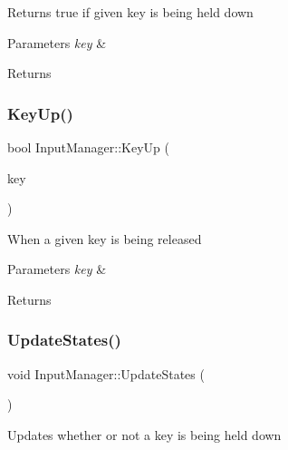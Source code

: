 Returns true if given key is being held down 


\begin{DoxyParams}{Parameters}
{\em key} & \\
\hline
\end{DoxyParams}
\begin{DoxyReturn}{Returns}

\end{DoxyReturn}
\mbox{\label{class_input_manager_a51be2b05d46039439a8f104d374a18aa}} 
\subsubsection{\texorpdfstring{Key\+Up()}{KeyUp()}}
{\footnotesize\ttfamily bool Input\+Manager\+::\+Key\+Up (\begin{DoxyParamCaption}\item[{S\+D\+L\+\_\+\+Keycode}]{key }\end{DoxyParamCaption})}



When a given key is being released 


\begin{DoxyParams}{Parameters}
{\em key} & \\
\hline
\end{DoxyParams}
\begin{DoxyReturn}{Returns}

\end{DoxyReturn}
\mbox{\label{class_input_manager_a0c1dc308a646b8fcdbdae7f9feea9287}} 
\subsubsection{\texorpdfstring{Update\+States()}{UpdateStates()}}
{\footnotesize\ttfamily void Input\+Manager\+::\+Update\+States (\begin{DoxyParamCaption}{ }\end{DoxyParamCaption})}



Updates whether or not a key is being held down 




